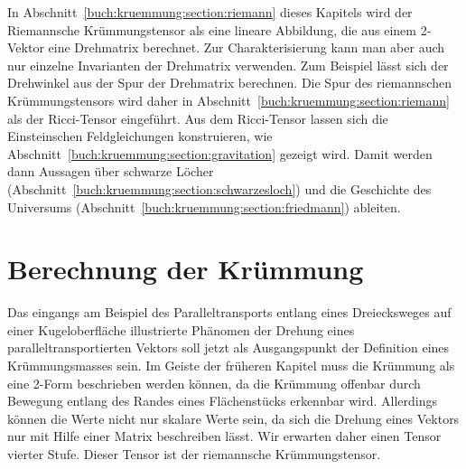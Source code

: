 In Abschnitt~\ref{buch:kruemmung:section:riemann} dieses Kapitels
wird der Riemannsche Krümmungstensor als eine lineare Abbildung,
die aus einem 2-Vektor eine Drehmatrix berechnet.
Zur Charakterisierung kann man aber auch nur einzelne Invarianten
der Drehmatrix verwenden.
Zum Beispiel lässt sich der Drehwinkel aus der Spur der Drehmatrix
berechnen.
Die Spur des riemannschen Krümmungstensors wird daher in 
Abschnitt~\ref{buch:kruemmung:section:riemann} als der Ricci-Tensor
eingeführt.
Aus dem Ricci-Tensor lassen sich die Einsteinschen Feldgleichungen
konstruieren, wie Abschnitt~\ref{buch:kruemmung:section:gravitation}
gezeigt wird.
Damit werden dann Aussagen über schwarze Löcher
(Abschnitt~\ref{buch:kruemmung:section:schwarzesloch})
und die Geschichte des Universums
(Abschnitt~\ref{buch:kruemmung:section:friedmann})
ableiten.

%
%
\section{Berechnung der Krümmung
\label{buch:kruemmung:section:riemann}}
Das eingangs am Beispiel des Paralleltransports entlang eines
Dreiecksweges auf einer Kugeloberfläche illustrierte Phänomen
der Drehung eines paralleltransportierten Vektors soll jetzt
als Ausgangspunkt der Definition eines Krümmungsmasses sein.
Im Geiste der früheren Kapitel muss die Krümmung als eine 2-Form
beschrieben werden können, da die Krümmung offenbar durch Bewegung
entlang des Randes eines Flächenstücks erkennbar wird.
Allerdings können die Werte nicht nur skalare Werte sein, da
sich die Drehung eines Vektors nur mit Hilfe einer Matrix
beschreiben lässt.
Wir erwarten daher einen Tensor vierter Stufe.
Dieser Tensor ist der riemannsche Krümmungstensor.

%
%

